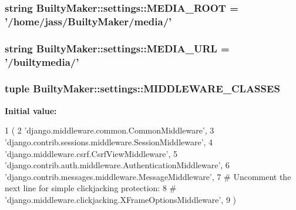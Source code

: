 \hypertarget{namespaceBuiltyMaker_1_1settings_ab380b04af8f9c17ed3d2f65949624c96}{
\subsubsection[{\-M\-E\-D\-I\-A\-\_\-\-R\-O\-O\-T}]{\setlength{\rightskip}{0pt plus 5cm}string {\bf \-Builty\-Maker\-::settings\-::\-M\-E\-D\-I\-A\-\_\-\-R\-O\-O\-T} = '/home/jass/\-Builty\-Maker/media/'}}\label{namespaceBuiltyMaker_1_1settings_ab380b04af8f9c17ed3d2f65949624c96}
\hypertarget{namespaceBuiltyMaker_1_1settings_acd5a1424e561da3ec1b0610d987e1bb6}{
\subsubsection[{\-M\-E\-D\-I\-A\-\_\-\-U\-R\-L}]{\setlength{\rightskip}{0pt plus 5cm}string {\bf \-Builty\-Maker\-::settings\-::\-M\-E\-D\-I\-A\-\_\-\-U\-R\-L} = '/builtymedia/'}}\label{namespaceBuiltyMaker_1_1settings_acd5a1424e561da3ec1b0610d987e1bb6}
\hypertarget{namespaceBuiltyMaker_1_1settings_a6fc30f431898973ff2b51145722948c8}{
\subsubsection[{\-M\-I\-D\-D\-L\-E\-W\-A\-R\-E\-\_\-\-C\-L\-A\-S\-S\-E\-S}]{\setlength{\rightskip}{0pt plus 5cm}tuple {\bf \-Builty\-Maker\-::settings\-::\-M\-I\-D\-D\-L\-E\-W\-A\-R\-E\-\_\-\-C\-L\-A\-S\-S\-E\-S}}}\label{namespaceBuiltyMaker_1_1settings_a6fc30f431898973ff2b51145722948c8}
{\bfseries \-Initial value\-:}
\begin{DoxyCode}
1 (
2     'django.middleware.common.CommonMiddleware',
3     'django.contrib.sessions.middleware.SessionMiddleware',
4     'django.middleware.csrf.CsrfViewMiddleware',
5     'django.contrib.auth.middleware.AuthenticationMiddleware',
6     'django.contrib.messages.middleware.MessageMiddleware',
7     # Uncomment the next line for simple clickjacking protection:
8     # 'django.middleware.clickjacking.XFrameOptionsMiddleware',
9 )
\end{DoxyCode}
